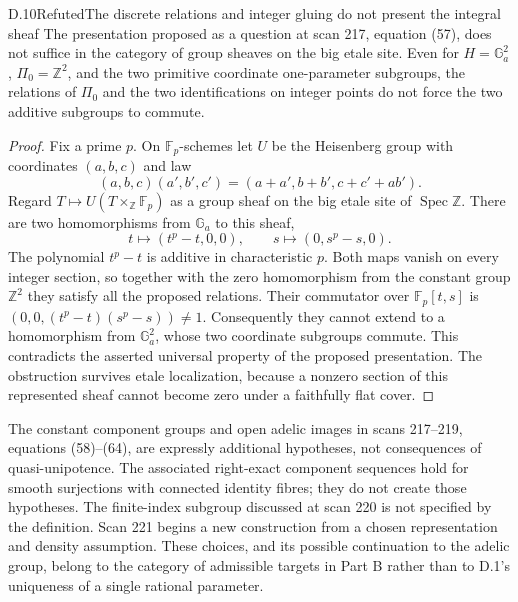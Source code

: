 \begin{statement}{D.10}{Refuted}{The discrete relations and integer gluing do not present the integral sheaf}
The presentation proposed as a question at scan 217, equation (57),
does not suffice in the category of group sheaves on the big etale
site.  Even for $H=\mathbb G_a^2$, $\Pi_0=\mathbb Z^2$, and the
two primitive coordinate one-parameter subgroups, the relations
of $\Pi_0$ and the two identifications on integer points do not
force the two additive subgroups to commute.
\end{statement}
\begin{proof}
Fix a prime $p$.  On $\mathbb F_p$-schemes let $U$ be the Heisenberg
group with coordinates $(a,b,c)$ and law
\[
 (a,b,c)(a',b',c')=(a+a',b+b',c+c'+ab').
\]
Regard $T\mapsto U(T\times_{\mathbb Z}\mathbb F_p)$ as a group
sheaf on the big etale site of $\operatorname{Spec}\mathbb Z$.
There are two homomorphisms from $\mathbb G_a$ to this sheaf,
\[
 t\longmapsto(t^p-t,0,0),\qquad
 s\longmapsto(0,s^p-s,0).
\]
The polynomial $t^p-t$ is additive in characteristic $p$.  Both
maps vanish on every integer section, so together with the zero
homomorphism from the constant group $\mathbb Z^2$ they satisfy
all the proposed relations.  Their commutator over
$\mathbb F_p[t,s]$ is $(0,0,(t^p-t)(s^p-s))\ne1$.
Consequently they cannot extend to a homomorphism from
$\mathbb G_a^2$, whose two coordinate subgroups commute.  This
contradicts the asserted universal property of the proposed
presentation.  The obstruction survives etale localization,
because a nonzero section of this represented sheaf cannot
become zero under a faithfully flat cover.
\end{proof}

The constant component groups and open adelic images in scans
217--219, equations (58)--(64), are expressly additional hypotheses,
not consequences of quasi-unipotence.  The associated right-exact
component sequences hold for smooth surjections with connected
identity fibres; they do not create those hypotheses.  The
finite-index subgroup discussed at scan 220 is not specified by
the definition.  Scan 221 begins a new construction from a chosen
representation and density assumption.  These choices, and its
possible continuation to the adelic group, belong to the category
of admissible targets in Part B rather than to D.1's uniqueness
of a single rational parameter.

